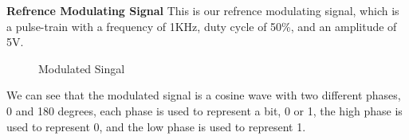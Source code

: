 \documentclass[12pt]{article}
\begin{document}
\textbf{Refrence Modulating Signal}
This is our refrence modulating signal, which is a pulse-train with a frequency of 1KHz, duty cycle of 50\%, and an amplitude of 5V.
\begin{figure}[H]
    \centering
    \caption{Modulated Singal}
\end{figure}
We can see that the modulated signal is a cosine wave with two different phases, 0 and 180 degrees, each phase is used to represent a bit, 0 or 1, the high phase is used to represent 0, and the low phase is used to represent 1.
\end{document}
